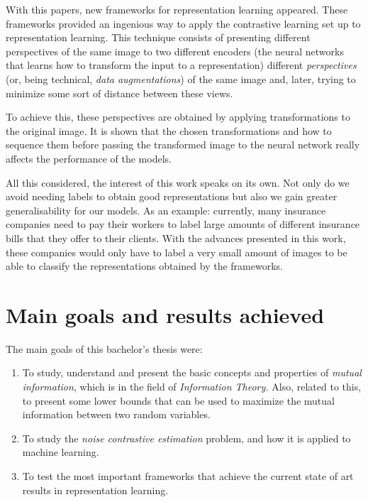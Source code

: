 With this papers, new frameworks for representation learning appeared. These frameworks provided an ingenious way to apply  the contrastive learning set up to representation learning. This technique consists of presenting different perspectives of the same image to two different encoders (the neural networks that learns how to transform the input to a representation) different \emph{perspectives} (or, being technical, \emph{data augmentations}) of the same image and, later, trying to minimize some sort of distance between these views.  

To achieve this, these perspectives are obtained by applying transformations to the original image. It is shown that the chosen transformations and how to sequence them before passing the transformed image to the neural network really affects the performance of the models.

All this considered, the interest of this work  speaks on its own. Not only do we avoid needing labels to obtain good representations but also we gain greater generalisability  for our models. As an example: currently, many insurance companies need to pay their workers to label large amounts of  different insurance bills that they offer to their clients. With the advances presented in this work, these companies would only have to label a very small amount of images to be able to classify the representations obtained by the frameworks.

\newpage

\section*{Main goals and results achieved}

The main goals of this bachelor's thesis were:
\begin{enumerate}
\item To study, understand and present the basic concepts and properties of \emph{mutual information}, which is in the field of \emph{Information Theory.} Also, related to this, to present some lower bounds that can be used to maximize the mutual information between two random variables.
\item To study the \emph{noise contrastive estimation} problem, and how it is applied to machine learning.

\item To test the most important frameworks that achieve the current state of art results in representation learning. 
\end{enumerate}

